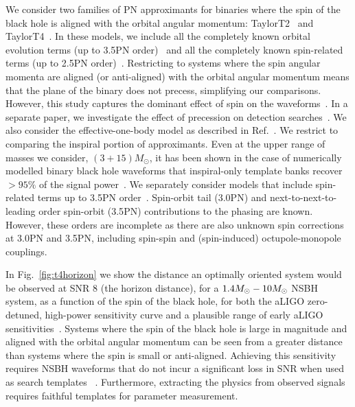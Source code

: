 We consider two families of \ac{PN} approximants for binaries where the spin
of the black hole is aligned with the orbital angular momentum:
TaylorT2~\cite{Blanchet:1996pi, Droz:1999qx, Blanchet:2006zz} and
TaylorT4~\cite{Buonanno:2002fy}.  In these models, we include all the
completely known orbital evolution terms (up to 3.5\ac{PN} order)~\cite{Wiseman:1993aj,Blanchet:1995fg,Blanchet:1995ez,Blanchet:1996pi,
Blanchet:2001ax, Blanchet:2004ek} and all the
completely known spin-related terms (up to 2.5\ac{PN}
order)~\cite{Faye:2006gx, Blanchet:2006gy, Kidder:1992fr, Mikoczi:2005dn,
Racine:2008kj}.  Restricting to systems where the spin angular momenta are
aligned (or anti-aligned) with the orbital angular momentum means that the
plane of the binary does not precess, simplifying our comparisons. However,
this study captures the dominant effect of spin on the
waveforms~\cite{Brown:2012gs}. In a separate paper, we investigate the effect
of precession on detection searches~\cite{Harry:2013tca}.
We also consider the
effective-one-body model as described in Ref.~\cite{Taracchini:2012ig}. 
We restrict to comparing the inspiral portion of approximants. Even at the upper 
range of masses we consider, $(3+15)M_{\odot}$, it has been shown in the case of numerically modelled 
binary black hole waveforms that inspiral-only
template banks recover $> 95\%$ of the signal power~\cite{Brown:2012nn, Smith:2013mfa}.
We separately consider models that include
spin-related terms up to 3.5\ac{PN} order~\cite{Bohe:2013cla,
Blanchet:2011zv}. Spin-orbit tail (3.0\ac{PN}) and next-to-next-to-leading
order spin-orbit (3.5\ac{PN}) contributions to the phasing are known.
However, these orders are incomplete as there are also unknown spin
corrections at 3.0\ac{PN} and 3.5\ac{PN}, including spin-spin and
(spin-induced) octupole-monopole couplings. 

In Fig.~\ref{fig:t4horizon} we show  
the distance an optimally oriented system would be observed at \ac{SNR} 8 (the horizon distance),
for a $1.4M_\odot-10M_\odot$ \ac{NSBH} system, as a function of the spin of the
black hole, for both the \ac{aLIGO} zero-detuned, high-power sensitivity curve and a
plausible range of early \ac{aLIGO} sensitivities~\cite{Aasi:2013wya}. 
Systems where the spin of the black hole is large in magnitude and aligned with the orbital 
angular momentum can be seen from a greater distance than systems where the spin is 
small or anti-aligned. Achieving this sensitivity requires \ac{NSBH} waveforms that do not
incur a significant loss in \ac{SNR} when used as search templates ~\cite{Apostolatos:1996rf}.
Furthermore, extracting the physics from observed signals requires faithful templates for parameter measurement.

